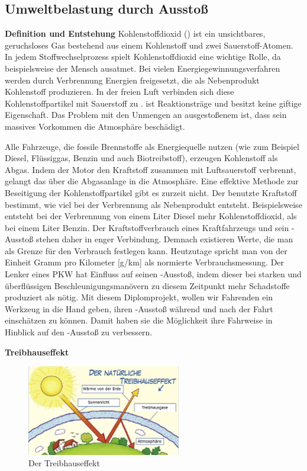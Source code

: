 \subsection{Umweltbelastung durch  Ausstoß}


\textbf{Definition und Entstehung\newline}
Kohlenstoffdioxid () ist ein unsichtbares, geruchsloses Gas bestehend aus einem Kohlenstoff und zwei Sauerstoff-Atomen. 
In jedem Stoffwechselprozess spielt Kohlenstoffdioxid eine wichtige Rolle, da beispielsweise der Mensch  ausatmet. 
Bei vielen Energiegewinnungsverfahren werden durch Verbrennung Energien freigesetzt, die als Nebenprodukt Kohlenstoff produzieren. 
In der freien Luft verbinden sich diese Kohlenstoffpartikel mit Sauerstoff zu .
 ist Reaktionsträge und besitzt keine giftige Eigenschaft. 
Das Problem mit den Unmengen an ausgestoßenem  ist, dass sein massives Vorkommen die Atmosphäre beschädigt.

Alle Fahrzeuge, die fossile Brennstoffe als Energiequelle nutzen 
(wie zum Beispiel Diesel, Flüssiggas, Benzin und auch Biotreibstoff), erzeugen Kohlenstoff als Abgas. 
Indem der Motor den Kraftstoff zusammen mit Luftsauerstoff verbrennt, gelangt das  über die Abgasanlage in die Atmosphäre. 
Eine effektive Methode zur Beseitigung der Kohlenstoffpartikel gibt es zurzeit nicht. 
Der benutzte Kraftstoff bestimmt, wie viel  bei der Verbrennung als Nebenprodukt entsteht.
Beispielsweise entsteht bei der Verbrennung von einem Liter Diesel mehr Kohlenstoffdioxid, als bei einem Liter Benzin.
Der Kraftstoffverbrauch eines Kraftfahrzeugs und sein -Ausstoß stehen daher in enger Verbindung.
Demnach existieren Werte, die man als Grenze für den Verbrauch festlegen kann. 
Heutzutage spricht man von der Einheit Gramm pro Kilometer [g/km] als normierte Verbrauchsmessung.
Der Lenker eines PKW hat Einfluss auf seinen -Ausstoß, indem dieser bei starken und überflüssigen Beschleunigungsmanövern
zu diesem Zeitpunkt mehr Schadstoffe produziert als nötig.
Mit diesem Diplomprojekt, wollen wir Fahrenden ein Werkzeug in die Hand geben, ihren -Ausstoß während und nach der Fahrt
einschätzen zu können. Damit haben sie die Möglichkeit ihre Fahrweise in Hinblick auf den -Ausstoß zu verbessern. \nextline


\textbf{Treibhauseffekt}
\begin{figure}
    \centering
    \includegraphics[width=0.6\textwidth]{images/treibhaus1}
    \caption{Der Treibhauseffekt \cite{BOZH.ch1-co2-umwelt.treibhaus1}}
\end{figure}
 
